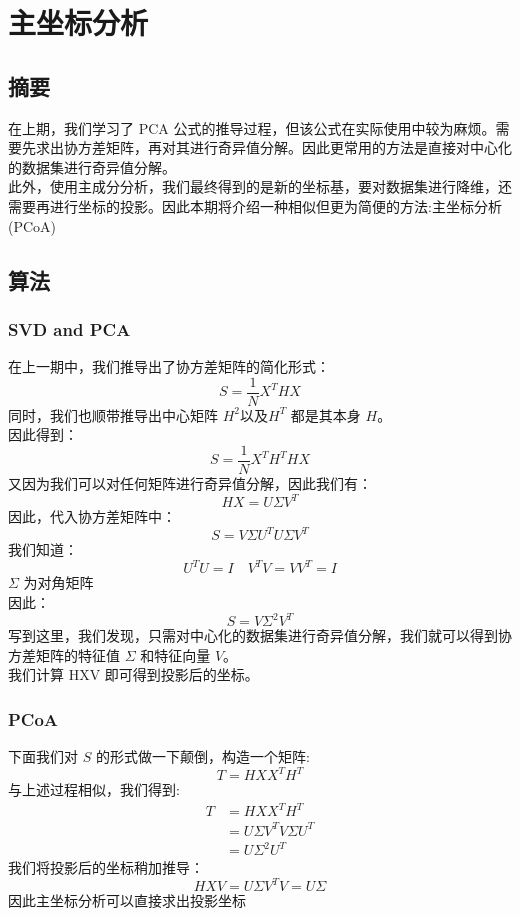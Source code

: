 \documentclass{report}
\begin{document}
\section{主坐标分析}
\subsection{摘要}
在上期，我们学习了 PCA 公式的推导过程，但该公式在实际使用中较为麻烦。需要先求出协方差矩阵，再对其进行奇异值分解。因此更常用的方法是直接对中心化的数据集进行奇异值分解。\\
此外，使用主成分分析，我们最终得到的是新的坐标基，要对数据集进行降维，还需要再进行坐标的投影。因此本期将介绍一种相似但更为简便的方法:主坐标分析 (PCoA)
\subsection{算法}
\subsubsection{SVD and PCA}
在上一期中，我们推导出了协方差矩阵的简化形式：
$$
S=\frac{1}{N} X^T H X
$$
同时，我们也顺带推导出中心矩阵 $H^2以及H^T$ 都是其本身 $H$。\\
因此得到：
$$
S=\frac{1}{N} X^T H^T H X
$$
又因为我们可以对任何矩阵进行奇异值分解，因此我们有：
$$
HX = U \Sigma V^T
$$
因此，代入协方差矩阵中：
$$
S = V \Sigma U^T U \Sigma V^T
$$
我们知道：
$$
U^T U=I \quad V^T V = V V^T= I
$$
$\Sigma$ 为对角矩阵\\
因此：
$$
S=V\Sigma ^2 V^T
$$
写到这里，我们发现，只需对中心化的数据集进行奇异值分解，我们就可以得到协方差矩阵的特征值 $\Sigma$ 和特征向量 $V$。\\
我们计算 HXV 即可得到投影后的坐标。
\subsubsection{PCoA}
下面我们对 $S$ 的形式做一下颠倒，构造一个矩阵:
$$
T=HXX^TH^T
$$
与上述过程相似，我们得到:
$$
\begin{aligned}
T&=HXX^TH^T\\
&=U\Sigma V^T V\Sigma U^T\\
&=U\Sigma^2 U^T
\end{aligned}
$$
我们将投影后的坐标稍加推导：
$$
HXV=U\Sigma V^TV=U\Sigma
$$
因此主坐标分析可以直接求出投影坐标
\end{document}
